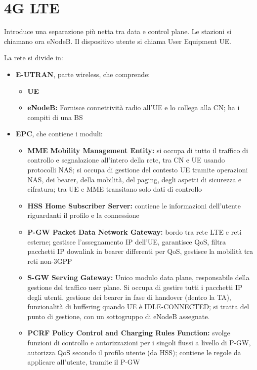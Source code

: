 \section{4G LTE}

Introduce una separazione più netta tra data e control plane. Le stazioni si chiamano ora eNodeB. Il dispositivo utente si chiama User Equipment UE.

La rete si divide in: 
\begin{itemize}
    \item \textbf{E-UTRAN}, parte wireless, che comprende:
    \begin{itemize}
        \item \textbf{UE}
        
        \item \textbf{eNodeB:} Fornisce connettività radio all'UE e lo collega alla CN; ha i compiti di una BS
    \end{itemize}
    
    \item \textbf{EPC}, che contiene i moduli: 
    \begin{itemize}
        \item \textbf{MME Mobility Management Entity:} si occupa di tutto il traffico di controllo e segnalazione all'intero della rete, tra CN e UE usando protocolli NAS; si occupa di gestione del contesto UE tramite operazioni NAS, dei bearer, della mobilità, del paging, degli aspetti di sicurezza e cifratura; tra UE e MME transitano solo dati di controllo
        
        \item \textbf{HSS Home Subscriber Server:} contiene le informazioni dell'utente riguardanti il profilo e la connessione
        
        \item \textbf{P-GW Packet Data Network Gateway:} bordo tra rete LTE e reti esterne; gestisce l'assegnamento IP dell'UE, garantisce QoS, filtra pacchetti IP downlink in bearer differenti per QoS, gestisce la mobilità tra reti non-3GPP
        
        \item \textbf{S-GW Serving Gateway:} Unico modulo data plane, responsabile della gestione del traffico user plane. Si occupa di gestire tutti i pacchetti IP degli utenti, gestione dei bearer in fase di handover (dentro la TA), funzionalità di buffering quando UE è IDLE-CONNECTED; si tratta del punto di gestione, con un sottogruppo di eNodeB assegnate.
        
        \item \textbf{PCRF Policy Control and Charging Rules Function:} svolge funzioni di controllo e autorizzazioni per i singoli flussi a livello di P-GW, autorizza QoS secondo il profilo utente (da HSS); contiene le regole da applicare all'utente, tramite il P-GW
    \end{itemize}
\end{itemize}

